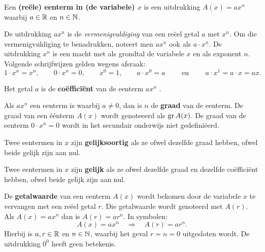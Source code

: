 \documentclass{ximera}
\begin{document}
\begin{definition} 
Een \textbf{(reële) eenterm in (de variabele) $x$} is een uitdrukking $A(x) = ax^n$ waarbij $a \in \mathbb{R}$ en $n \in \mathbb{N}$. 

De uitdrukking $ax^n$ is de \textit{ vermenigvuldiging} van een reëel getal $a$ met $x^n$. Om die vermenigvuldiging te benadrukken, noteert men $ax^n$  ook als $a \cdot x^n$. De uitdrukking $x^n$ is een macht met als grondtal de variabele $x$ en als exponent $n$. Volgende schrijfwijzen gelden wegens afsraak:
\[
1\cdot x^n = x^n, \qquad
0\cdot x^n = 0, \qquad  
x^0 = 1, \qquad 
a\cdot x^0 = a \qquad \text{ en } \qquad 
a\cdot x^1 = a \cdot x = ax.
\]

Het getal $a$ is de \textbf{coëfficiënt} van de eenterm $ax^n$ .

Als $ax^n$ een eenterm is waarbij $a \neq 0$, dan is $n$ de \textbf{graad} van de eenterm. De graad van een éénterm \(A(x)\) wordt genoteeerd als $\operatorname{gr} A(x)$. De graad van de eenterm $0\cdot x^n = 0$ wordt in het secundair onderwijs niet gedefiniëerd.


Twee eentermen in $x$ zijn \textbf{gelijksoortig} als ze ofwel dezelfde graad hebben, ofwel beide gelijk zijn aan nul.

Twee eentermen in $x$ zijn \textbf{gelijk} als ze ofwel dezelfde graad en dezelfde coëfficiënt hebben, ofwel beide gelijk zijn aan nul.


De \textbf{getalwaarde} van een eenterm $A(x)$ wordt bekomen door de variabele $x$ te vervangen met een reëel getal $r$. Die getalwaarde wordt genoteerd met $A(r)$. Als $A(x) = ax^n$ dan is $A(r) = ar^n$. In symbolen:
\[
A(x) = ax^n \quad \Rightarrow \quad A(r) = a r^n.
\]
Hierbij is $a,r \in \mathbb{R}$ en $n \in \mathbb{N}$, waarbij het geval $r = n = 0$ uitgesloten wordt. De uitdrukking $0^0$ heeft geen betekenis.


\end{definition} 


\end{document}
